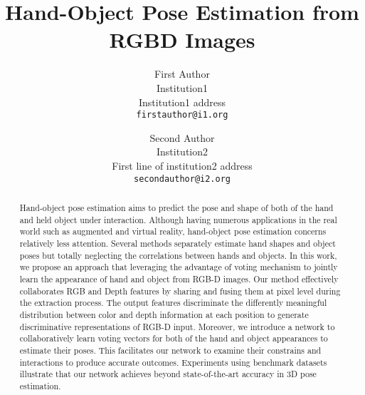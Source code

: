 \documentclass[review]{cvpr}
\begin{document}
\title{Hand-Object Pose Estimation from RGBD Images}

\author{First Author\\
Institution1\\
Institution1 address\\
{\tt\small firstauthor@i1.org}
\and
Second Author\\
Institution2\\
First line of institution2 address\\
{\tt\small secondauthor@i2.org}
}

\maketitle


\begin{abstract}
Hand-object pose estimation aims to predict the pose and shape of both of the hand and held object under interaction. Although having numerous applications in the real world such as augmented and virtual reality, hand-object pose estimation concerns relatively less attention. Several methods separately estimate hand shapes and object poses but totally neglecting the correlations between hands and objects. In this work, we propose an approach that leveraging the advantage of voting mechanism to jointly learn the appearance of hand and object from RGB-D images. Our method effectively collaborates RGB and Depth features by sharing and fusing them at pixel level during the extraction process. The output features discriminate the differently meaningful distribution between color and depth information at each position to generate discriminative representations of RGB-D input. Moreover, we introduce a network to collaboratively learn voting vectors for both of the hand and object appearances to estimate their poses. This facilitates our network to examine their constrains and interactions to produce accurate outcomes. Experiments using benchmark datasets illustrate that our network achieves beyond state-of-the-art accuracy in 3D pose estimation.
\end{abstract}


%

%

%

%

%
{\small


}
\end{document}
